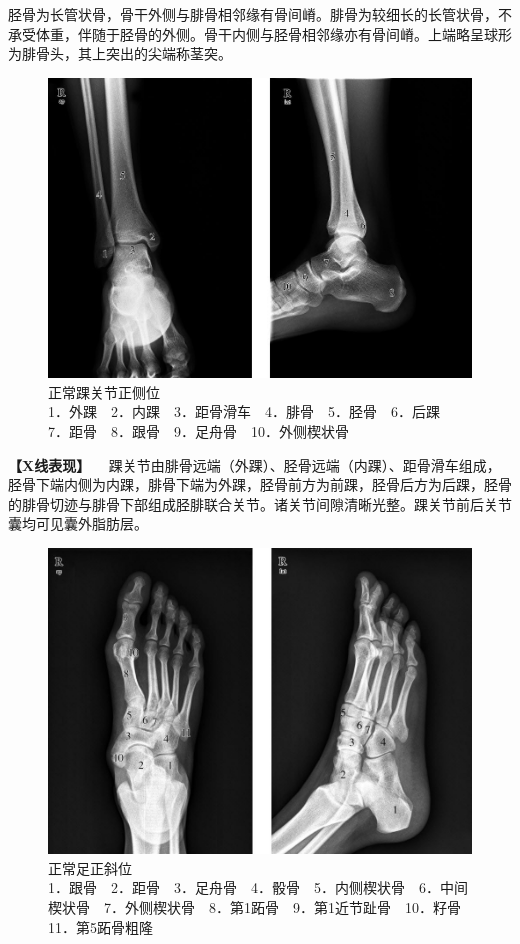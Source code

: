 胫骨为长管状骨，骨干外侧与腓骨相邻缘有骨间嵴。腓骨为较细长的长管状骨，不承受体重，伴随于胫骨的外侧。骨干内侧与胫骨相邻缘亦有骨间嵴。上端略呈球形为腓骨头，其上突出的尖端称茎突。

\begin{figure}[!htbp]
 \centering
 \includegraphics{./images/Image00009.jpg}
 \captionsetup{justification=centering}
 \caption{正常踝关节正侧位\\{\small 1．外踝　2．内踝　3．距骨滑车　4．腓骨　5．胫骨　6．后踝　7．距骨　8．跟骨　9．足舟骨　10．外侧楔状骨}}
 \label{fig2-1-7}
  \end{figure} 

\textbf{【X线表现】}
　踝关节由腓骨远端（外踝）、胫骨远端（内踝）、距骨滑车组成，胫骨下端内侧为内踝，腓骨下端为外踝，胫骨前方为前踝，胫骨后方为后踝，胫骨的腓骨切迹与腓骨下部组成胫腓联合关节。诸关节间隙清晰光整。踝关节前后关节囊均可见囊外脂肪层。

\begin{figure}[!htbp]
 \centering
 \includegraphics{./images/Image00010.jpg}
 \captionsetup{justification=centering}
 \caption{正常足正斜位\\{\small 1．跟骨　2．距骨　3．足舟骨　4．骰骨　5．内侧楔状骨　6．中间楔状骨　7．外侧楔状骨　8．第1跖骨　9．第1近节趾骨　10．籽骨　11．第5跖骨粗隆}}
 \label{fig2-1-8}
  \end{figure} 

